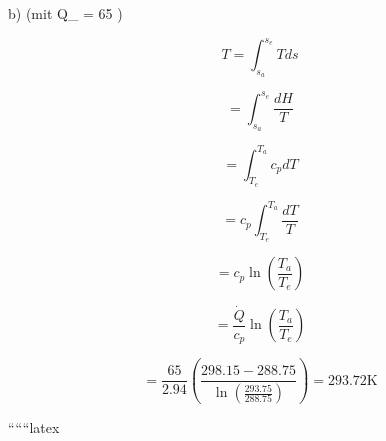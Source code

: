 b) (mit Q_{} = 65 )

\[
T = \int_{s_a}^{s_e} T ds
\]

\[
= \int_{s_a}^{s_e} \frac{dH}{T}
\]

\[
= \int_{T_e}^{T_a} c_p dT
\]

\[
= c_p \int_{T_e}^{T_a} \frac{dT}{T}
\]

\[
= c_p \ln \left( \frac{T_a}{T_e} \right)
\]

\[
= \frac{\dot{Q}}{c_p} \ln \left( \frac{T_a}{T_e} \right)
\]

\[
= \frac{65}{2.94} \left( \frac{298.15 - 288.75}{\ln \left( \frac{293.75}{288.75} \right)} \right) = 293.72 \text{K}
\]

``````latex